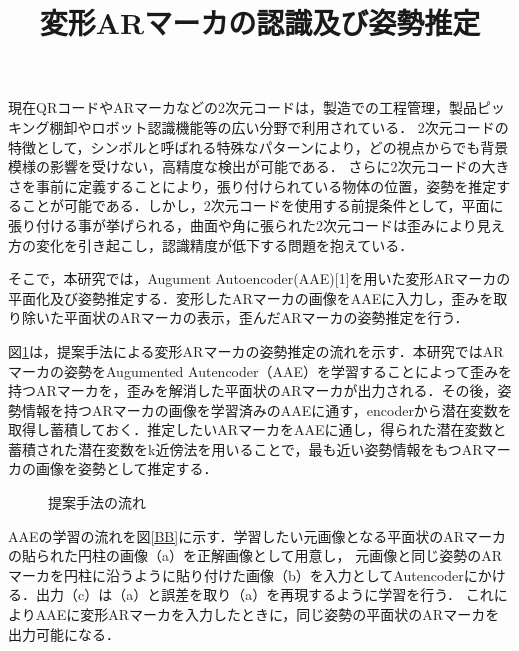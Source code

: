 \documentclass{jsarticle}
\title{変形ARマーカの認識及び姿勢推定}
\begin{document}
\maketitle

現在QRコードやARマーカなどの2次元コードは，製造での工程管理，製品ピッキング棚卸やロボット認識機能等の広い分野で利用されている．
2次元コードの特徴として，シンボルと呼ばれる特殊なパターンにより，どの視点からでも背景模様の影響を受けない，高精度な検出が可能である．
さらに2次元コードの大きさを事前に定義することにより，張り付けられている物体の位置，姿勢を推定することが可能である．しかし，2次元コードを使用する前提条件として，平面に張り付ける事が挙げられる，曲面や角に張られた2次元コードは歪みにより見え方の変化を引き起こし，認識精度が低下する問題を抱えている．

そこで，本研究では，Augument Autoencoder(AAE)[1]を用いた変形ARマーカの平面化及び姿勢推定する．変形したARマーカの画像をAAEに入力し，歪みを取り除いた平面状のARマーカの表示，歪んだARマーカの姿勢推定を行う．


図\ref{flow}は，提案手法による変形ARマーカの姿勢推定の流れを示す．本研究ではARマーカの姿勢をAugumented Autencoder（AAE）を学習することによって歪みを持つARマーカを，歪みを解消した平面状のARマーカが出力される．その後，姿勢情報を持つARマーカの画像を学習済みのAAEに通す，encoderから潜在変数を取得し蓄積しておく．推定したいARマーカをAAEに通し，得られた潜在変数と蓄積された潜在変数をk近傍法を用いることで，最も近い姿勢情報をもつARマーカの画像を姿勢として推定する．

\begin{figure}[ht]
\vspace{-5zh}
\setlength{\epsfxsize}{3cm}
\centerline{}
\vspace{8zh}
\caption{提案手法の流れ}
\label{flow}
\vspace{-1.0zh}
\end{figure}

AAEの学習の流れを図\ref{BB}に示す．学習したい元画像となる平面状のARマーカの貼られた円柱の画像（a）を正解画像として用意し，
元画像と同じ姿勢のARマーカを円柱に沿うように貼り付けた画像（b）を入力としてAutencoderにかける．出力（c）は（a）と誤差を取り（a）を再現するように学習を行う．
これによりAAEに変形ARマーカを入力したときに，同じ姿勢の平面状のARマーカを出力可能になる．
\end{document}
